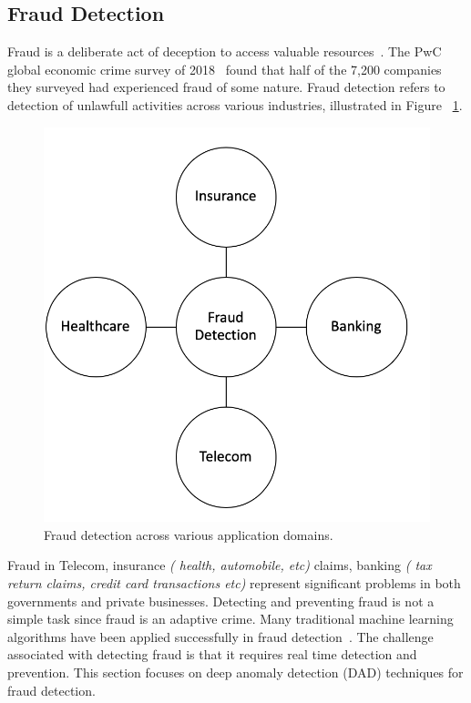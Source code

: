 \subsection{Fraud Detection}
Fraud is a deliberate act of deception to access valuable resources~\cite{abdallah2016fraud}. The PwC global economic crime survey of 2018~\cite{Lavion2018,zhao2013fraud} found that half of the 7,200 companies they surveyed had experienced fraud of some nature. Fraud detection refers to detection of unlawfull activities across various industries, illustrated in Figure ~\ref{fig:AerasOfFraud}.

\begin{figure}[h]
\includegraphics[scale=0.5]{images/AreasOfFraud}
\captionsetup{justification=centering}
\caption{Fraud detection across various application domains.}
\label{fig:AerasOfFraud}
\end{figure}

Fraud in Telecom, insurance \textit{( health, automobile, etc)} claims, banking \textit{( tax return claims, credit card transactions etc)} represent significant problems in both governments and private businesses. Detecting and preventing fraud is not a simple task since fraud is an adaptive crime. Many traditional machine learning algorithms have been applied successfully in fraud detection~\cite{sorournejad2016survey}.  The challenge associated with detecting fraud is that it requires real time detection and prevention. This section focuses on deep anomaly detection (DAD) techniques for fraud detection.

